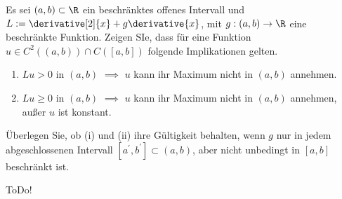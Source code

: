 
\begin{exercise}

Es sei $(a, b) \subset \R$ ein beschränktes offenes Intervall und $L := \derivative[2]{x} + g \derivative{x}$, mit $g: (a, b) \to \R$ eine beschränkte Funktion.
Zeigen SIe, dass für eine Funktion $u \in C^2((a, b)) \cap C([a, b])$ folgende Implikationen gelten.

\begin{enumerate}[label = (\roman*)]
    \item $Lu > 0$ in $(a, b)$ $\implies$ $u$ kann ihr Maximum nicht in $(a, b)$ annehmen.
    \item $Lu \geq 0$ in $(a, b)$ $\implies$ $u$ kann ihr Maximum nicht in $(a, b)$ annehmen, außer $u$ ist konstant.
\end{enumerate}

Überlegen Sie, ob (i) und (ii) ihre Gültigkeit behalten, wenn $g$ nur in jedem abgeschlossenen Intervall $[a^\prime, b^\prime] \subset (a, b)$, aber nicht unbedingt in $[a, b]$ beschränkt ist.

\end{exercise}


\begin{solution}

ToDo!

\end{solution}

